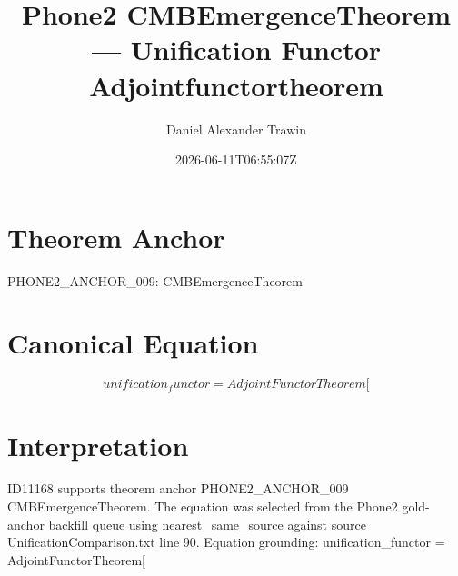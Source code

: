 \documentclass[11pt]{article}
\title{Phone2 CMBEmergenceTheorem — Unification Functor Adjointfunctortheorem}
\author{Daniel Alexander Trawin}
\date{2026-06-11T06:55:07Z}
\begin{document}
\maketitle
\section*{Theorem Anchor}
PHONE2_ANCHOR_009: CMBEmergenceTheorem
\section*{Canonical Equation}
\[
unification_functor = AdjointFunctorTheorem[
\]
\section*{Interpretation}
ID11168 supports theorem anchor PHONE2_ANCHOR_009 CMBEmergenceTheorem. The equation was selected from the Phone2 gold-anchor backfill queue using nearest_same_source against source UnificationComparison.txt line 90. Equation grounding: unification_functor = AdjointFunctorTheorem[
\end{document}
